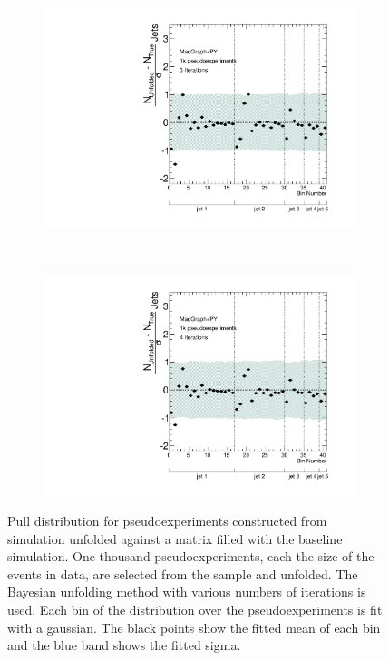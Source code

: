 \begin{figure}
\begin{subfigure}[]{0.5\textwidth}
\includegraphics[width=\textwidth]{fig/Stress/110872atlfast/Pull3Iterations.pdf}
\end{subfigure}
~
\begin{subfigure}[]{0.5\textwidth}
\includegraphics[width=\textwidth]{fig/Stress/110872atlfast/Pull4Iterations.pdf}
\end{subfigure}
\caption{Pull distribution for pseudoexperiments constructed from \newline \peight~ simulation unfolded against a matrix filled with the baseline simulation. One thousand pseudoexperiments, each the size of the events in data, are selected from the sample and unfolded. The Bayesian unfolding method with various numbers of iterations is used. Each bin of the distribution over the pseudoexperiments is fit with a gaussian. The black points show the fitted mean of each bin and the blue band shows the fitted sigma.}
\label{fig:p8pull}
\end{figure}
